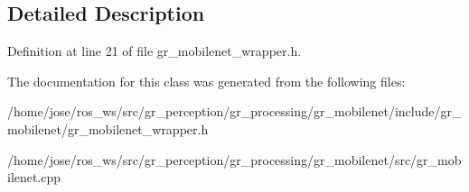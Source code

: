 \subsection{Detailed Description}


Definition at line 21 of file gr\+\_\+mobilenet\+\_\+wrapper.\+h.



The documentation for this class was generated from the following files\+:\begin{DoxyCompactItemize}
\item 
/home/jose/ros\+\_\+ws/src/gr\+\_\+perception/gr\+\_\+processing/gr\+\_\+mobilenet/include/gr\+\_\+mobilenet/gr\+\_\+mobilenet\+\_\+wrapper.\+h\item 
/home/jose/ros\+\_\+ws/src/gr\+\_\+perception/gr\+\_\+processing/gr\+\_\+mobilenet/src/gr\+\_\+mobilenet.\+cpp\end{DoxyCompactItemize}
